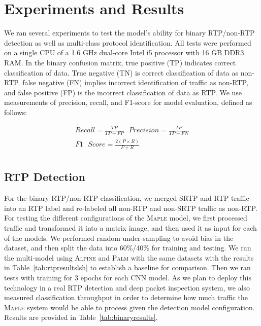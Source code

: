 \section{Experiments and Results}

We ran several experiments to test the model's ability for binary RTP/non-RTP detection as well as multi-class protocol identification. All tests were performed on a single CPU of a 1.6 GHz dual-core Intel i5 processor with 16 GB DDR3 RAM. In the binary confusion matrix, true positive (TP) indicates correct classification of data. True negative (TN) is correct classification of data as non-RTP. false negative (FN) implies incorrect identification of traffic as non-RTP, and false positive (FP) is the incorrect classification of data as RTP. We use measurements of precision, recall, and F1-score for model evaluation, defined as follows:

\begin{equation}
\begin{split}
    Recall = \frac{TP}{TP + FP} \text{  }
    Precision = \frac{TP}{TP + FN} \\
    F1\text{ }Score = \frac{2(P\times R)}{P + R} \\
    \end{split}
\end{equation}

\subsection{RTP Detection}

For the binary RTP/non-RTP classification, we merged SRTP and RTP traffic into an RTP label and re-labeled all non-RTP and non-SRTP traffic as non-RTP. For testing the different configurations of the \textsc{Maple} model, we first processed traffic and transformed it into a matrix image, and then used it as input for each of the models. We performed random under-sampling to avoid bias in the dataset, and then split the data into 60\%/40\% for training and testing. We ran the multi-model using \textsc{Alpine} and \textsc{Palm} with the same datasets with the results in Table~\ref{tab:rtpresultslsh} to establish a baseline for comparison. Then we ran tests with training for $3$ epochs for each CNN model. As we plan to deploy this technology in a real RTP detection and deep packet inspection system, we also measured classification throughput in order to determine how much traffic the \textsc{Maple} system would be able to process given the detection model configuration. Results are provided in Table~\ref{tab:binaryresults}.

